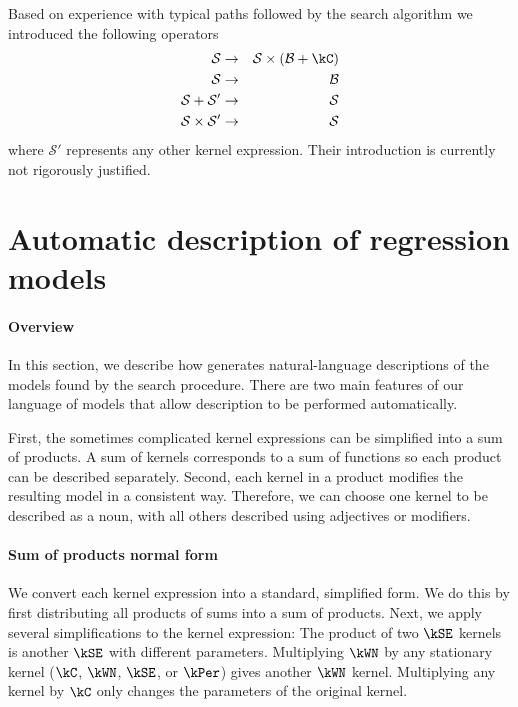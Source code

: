 Based on experience with typical paths followed by the search algorithm we introduced the following operators
%
\begin{eqnarray}
\mathcal{S} &\to& \mathcal{S} \times (\mathcal{B} + \kC)\\
\mathcal{S} &\to& \mathcal{B}\\
\mathcal{S} + \mathcal{S'} &\to& \mathcal{S}\\
\mathcal{S} \times \mathcal{S'} &\to& \mathcal{S}
\end{eqnarray}
%
where $\mathcal{S'}$ represents any other kernel expression.
Their introduction is currently not rigorously justified.

\section{Automatic description of regression models}
\label{sec:description:description}

\paragraph{Overview}

In this section, we describe how \procedurename{} generates natural-language descriptions of the models found by the search procedure.
There are two main features of our language of \gp{} models that allow description to be performed automatically.

First, the sometimes complicated kernel expressions can be simplified into a sum of products.
A sum of kernels corresponds to a sum of functions so each product can be described separately.
Second, each kernel in a product modifies the resulting model in a consistent way.
Therefore, we can choose one kernel to be described as a noun, with all others described using adjectives or modifiers.

\paragraph{Sum of products normal form} 

We convert each kernel expression into a standard, simplified form.
We do this by first distributing all products of sums into a sum of products.
Next, we apply several simplifications to the kernel expression:
The product of two $\kSE$ kernels is another $\kSE$ with different parameters. Multiplying $\kWN$ by any stationary kernel ($\kC$, $\kWN$, $\kSE$, or $\kPer$) gives another $\kWN$ kernel. Multiplying any kernel by $\kC$ only changes the parameters of the original kernel.

